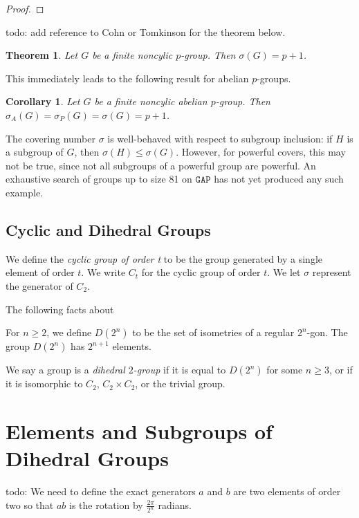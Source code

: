 \documentclass{amsart}
\numberwithin{equation} {section}
\newtheorem{theorem}[equation]{Theorem}
\newtheorem{corollary}[equation]{Corollary}
\theoremstyle{definition}
\begin{document}
\begin{proof}

\end{proof}

todo: add reference to Cohn or Tomkinson for the theorem below. 

\begin{theorem}\label{t:covering-number-doesnt-change-abelian} 
Let $G$ be a finite noncylic $p$-group. Then $\sigma(G) =  p + 1$.
\end{theorem}

This immediately leads to the following result for abelian $p$-groups. 

\begin{corollary}
Let $G$ be a finite noncylic abelian $p$-group. Then $\sigma_{A}(G) = \sigma_P(G) = \sigma(G) = p+1$.
\end{corollary}

The covering number $\sigma$ is well-behaved with respect to subgroup inclusion: if $H$ is a subgroup of $G$, then $\sigma(H) \leq \sigma(G)$. However, for powerful covers, this may not be true, since not all subgroups of a powerful group are powerful. An exhaustive search of groups up to size 81 on $\texttt{GAP}$ has not yet produced any such example.


\subsection{Cyclic and Dihedral Groups}

We define the \textit{cyclic group of order t} to be the group generated by a single element of order $t$. We write $C_t$ for the cyclic group of order $t$. We let $\sigma$ represent the generator of $C_2$. 

The following facts about 

For $n \geq 2$, we define $D(2^n)$ to be the set of isometries of a regular $2^n$-gon. The group $D(2^n)$ has $2^{n+1}$ elements. 

We say a group is a  \textit{dihedral $2$-group} if it is equal to $D(2^n)$ for some $n \geq 3$, or if it is isomorphic to $C_2$, $C_2 \times C_2$, or the trivial group. 


\section{Elements and Subgroups of Dihedral Groups}

todo: We need to define the exact generators $a$ and $b$ are two elements of order two so that $ab$ is the rotation by $\displaystyle\frac{2\pi}{2^n}$ radians. 
\end{document}
